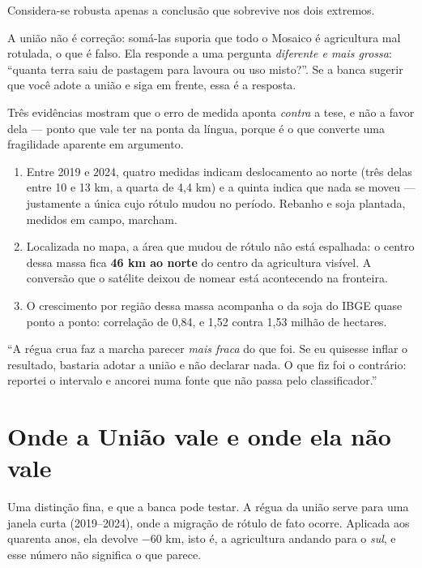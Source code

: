 Considera-se robusta apenas a conclusão que sobrevive nos dois extremos.

\begin{armadilha}
A união não é correção: somá-las suporia que todo o Mosaico é agricultura mal
rotulada, o que é falso. Ela responde a uma pergunta \emph{diferente e mais
grossa}: ``quanta terra saiu de pastagem para lavoura ou uso misto?''. Se a
banca sugerir que você adote a união e siga em frente, essa é a resposta.
\end{armadilha}

Três evidências mostram que o erro de medida aponta \emph{contra} a tese, e não
a favor dela --- ponto que vale ter na ponta da língua, porque é o que converte
uma fragilidade aparente em argumento.

\begin{enumerate}
\item Entre 2019 e 2024, quatro medidas indicam deslocamento ao norte (três
delas entre 10 e 13 km, a quarta de 4,4 km) e a quinta indica que nada se moveu
--- justamente a única cujo rótulo mudou no período. Rebanho e soja plantada,
medidos em campo, marcham.
\item Localizada no mapa, a área que mudou de rótulo não está espalhada: o
centro dessa massa fica \textbf{46 km ao norte} do centro da agricultura
visível. A conversão que o satélite deixou de nomear está acontecendo na
fronteira.
\item O crescimento por região dessa massa acompanha o da soja do IBGE quase
ponto a ponto: correlação de 0,84, e 1,52 contra 1,53 milhão de hectares.
\end{enumerate}

\begin{nabanca}
``A régua crua faz a marcha parecer \emph{mais fraca} do que foi. Se eu quisesse
inflar o resultado, bastaria adotar a união e não declarar nada. O que fiz foi o
contrário: reportei o intervalo e ancorei numa fonte que não passa pelo
classificador.''
\end{nabanca}

\section{Onde a União vale e onde ela não vale}

Uma distinção fina, e que a banca pode testar. A régua da união serve para uma
janela curta (2019--2024), onde a migração de rótulo de fato ocorre. Aplicada
aos quarenta anos, ela devolve $-60$ km, isto é, a agricultura andando para o
\emph{sul}, e esse número não significa o que parece.


